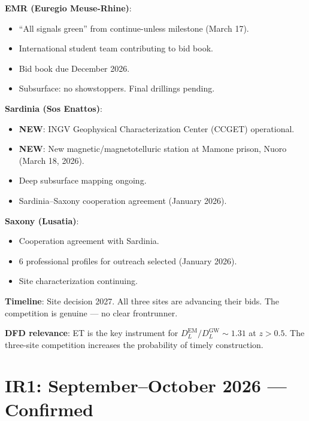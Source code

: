 \documentclass[11pt,a4paper]{article}
\newcommand{\NEW}{\textcolor{dfdblue}{\textbf{NEW}}}
\begin{document}
\begin{tcolorbox}[colback=blue!5!white, colframe=blue!60!black,
  title={ET Site Race: March 2026 Status --- All Three Active}]

\textbf{EMR (Euregio Meuse-Rhine)}:
\begin{itemize}
\item ``All signals green'' from continue-unless milestone (March 17).
\item International student team contributing to bid book.
\item Bid book due December 2026.
\item Subsurface: no showstoppers. Final drillings pending.
\end{itemize}

\textbf{Sardinia (Sos Enattos)}:
\begin{itemize}
\item \NEW: INGV Geophysical Characterization Center (CCGET) operational.
\item \NEW: New magnetic/magnetotelluric station at Mamone prison, Nuoro (March 18, 2026).
\item Deep subsurface mapping ongoing.
\item Sardinia--Saxony cooperation agreement (January 2026).
\end{itemize}

\textbf{Saxony (Lusatia)}:
\begin{itemize}
\item Cooperation agreement with Sardinia.
\item 6 professional profiles for outreach selected (January 2026).
\item Site characterization continuing.
\end{itemize}

\textbf{Timeline}: Site decision 2027. All three sites are advancing their bids. The competition is genuine --- no clear frontrunner.

\textbf{DFD relevance}: ET is the key instrument for $D_L^{\text{EM}}/D_L^{\text{GW}} \sim 1.31$ at $z > 0.5$. The three-site competition increases the probability of timely construction.
\end{tcolorbox}

\section{IR1: September--October 2026 --- Confirmed}
\end{document}
